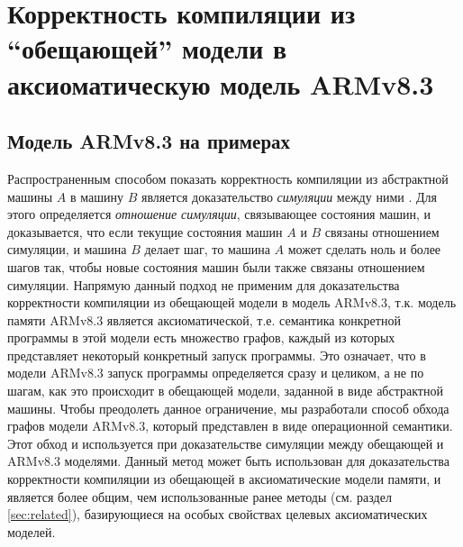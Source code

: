\chapter{Корректность компиляции из ``обещающей'' модели в аксиоматическую модель ARMv8.3} \label{sec:armv83}

\section{Модель ARMv8.3 на примерах} \label{sec:armv83examples}
Распространенным способом показать корректность компиляции из абстрактной машины $A$ в машину $B$
является доказательство \emph{симуляции} между ними \cite{Milner:Book89}. Для этого определяется \emph{отношение симуляции},
связывающее состояния машин, и доказывается, что если текущие состояния машин $A$ и $B$ связаны отношением
симуляции, и машина $B$ делает шаг, то машина $A$ может сделать ноль и более шагов так, чтобы новые состояния
машин были также связаны отношением симуляции. Напрямую данный подход не применим для доказательства
корректности компиляции из обещающей модели в модель ARMv8.3, т.к.
модель памяти ARMv8.3 является аксиоматической, т.е. семантика конкретной программы в этой модели есть
множество графов, каждый из которых представляет некоторый конкретный запуск программы. Это означает, что
в модели ARMv8.3 запуск программы определяется сразу и целиком, а не по шагам, как это происходит в
обещающей модели, заданной в виде абстрактной машины.
Чтобы преодолеть данное ограничение, мы разработали способ обхода графов модели ARMv8.3,
который представлен в виде операционной семантики.
Этот обход и используется при доказательстве симуляции между обещающей и ARMv8.3 моделями.
Данный метод может быть использован для доказательства корректности компиляции из
обещающей в аксиоматические модели памяти, и является более общим, чем использованные ранее методы
(см. раздел \ref{sec:related}), базирующиеся на особых свойствах целевых аксиоматических моделей.

